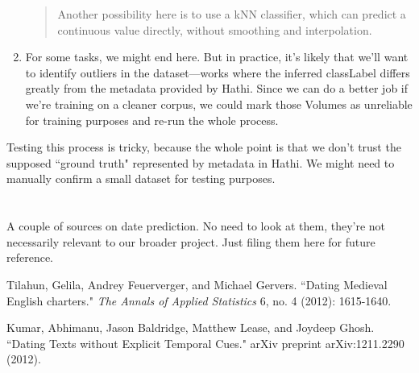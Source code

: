 \documentclass[12pt]{article}
\begin{document}
\begin{enumerate}
\begin{quote}
Another possibility here is to use a kNN classifier, which can predict a continuous value directly, without smoothing and interpolation.
\end{quote}
\item For some tasks, we might end here. But in practice, it's likely that we'll want to identify outliers in the dataset---works where the inferred classLabel differs greatly from the metadata provided by Hathi. Since we can do a better job if we're training on a cleaner corpus, we could mark those Volumes as unreliable for training purposes and re-run the whole process.
\end{enumerate}

Testing this process is tricky, because the whole point is that we don't trust the supposed ``ground truth" represented by metadata in Hathi. We might need to manually confirm a small dataset for testing purposes.

\section{}
A couple of sources on date prediction. No need to look at them, they're not necessarily relevant to our broader project. Just filing them here for future reference.
\begin{thebibliography}{1}
 Tilahun, Gelila, Andrey Feuerverger, and Michael Gervers. ``Dating Medieval English charters." \emph{The Annals of Applied Statistics} 6, no. 4 (2012): 1615-1640.

 Kumar, Abhimanu, Jason Baldridge, Matthew Lease, and Joydeep Ghosh. ``Dating Texts without Explicit Temporal Cues." arXiv preprint arXiv:1211.2290 (2012).
\end{thebibliography}
\end{document}
